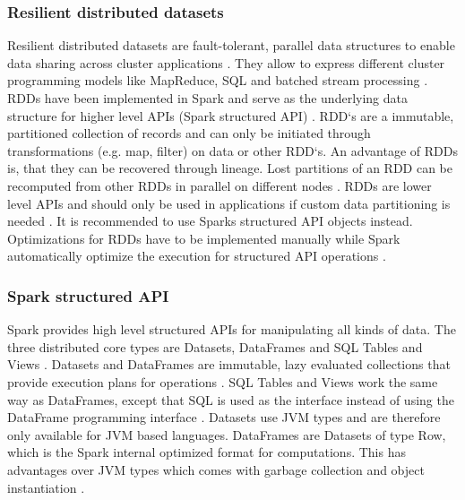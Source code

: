 \subsubsection{Resilient distributed datasets}
Resilient distributed datasets are fault-tolerant, parallel data structures to enable data sharing across cluster applications \cite{Zaharia2012RDDs}. They allow to express different cluster programming models like MapReduce, SQL and batched stream processing \cite{Zaharia2012RDDs}. RDDs have been implemented in Spark and serve as the underlying data structure for higher level APIs (Spark structured API) \cite{Zaharia2012RDDs}.
RDD`s are a immutable, partitioned collection of records and can only be initiated through transformations (e.g. map, filter) on data or other RDD`s.
An advantage of RDDs is, that they can be recovered through lineage. Lost partitions of an RDD can be recomputed from other RDDs in parallel on different nodes \cite{Zaharia2012RDDs}. 
RDDs are lower level APIs and should only be used in applications if custom data partitioning is needed \cite{Chambers2018Spark}. It is recommended to use Sparks structured API objects instead. Optimizations for RDDs have to be implemented manually while Spark automatically optimize the execution for structured API operations \cite{Chambers2018Spark}.


\subsubsection{Spark structured API}
Spark provides high level structured APIs for manipulating all kinds of data. The three distributed core types are Datasets, DataFrames and SQL Tables and Views \cite{Chambers2018Spark}.
Datasets and DataFrames are immutable, lazy evaluated collections that provide execution plans for operations \cite{Chambers2018Spark}. SQL Tables and Views work the same way as DataFrames, except that SQL is used as the interface instead of using the DataFrame programming interface \cite{Chambers2018Spark}.
Datasets use JVM types and are therefore only available for JVM based languages. DataFrames are Datasets of type Row, which is the Spark internal optimized format for computations. This has advantages over JVM types which comes with garbage collection and object instantiation \cite{Chambers2018Spark}.


